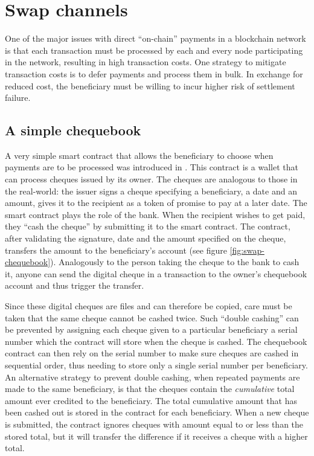 
\section{Swap channels}

One of the major issues with direct ``on-chain'' payments in a blockchain network is that each transaction must be processed by each and every node participating in the network, resulting in high transaction costs.
One strategy to mitigate transaction costs is to defer payments and process them in bulk. In exchange for reduced cost, the beneficiary must be willing to incur higher risk of settlement failure.

\subsection{A simple chequebook}\label{subsec:simple-chequebook}

A very simple smart contract that allows the beneficiary to choose when payments are to be processed was introduced in \cite{ethersphere2016sw3}.
This  contract is a wallet that can process cheques issued by its owner. The cheques are analogous to those in the real-world: the issuer signs a cheque specifying a beneficiary, a date and an amount, gives it to the recipient as a token of promise to pay at a later date. The smart contract plays the role of the bank. When the recipient wishes to get paid, they ``cash the cheque'' by submitting it to the smart contract. The contract, after validating the signature, date and the amount specified on the cheque, transfers the amount to the beneficiary's account (see figure \ref{fig:swap-chequebook}). Analogously to the person taking the cheque to the bank to cash it, anyone can send the digital cheque in a transaction to the owner's chequebook account and thus trigger the transfer. 



Since these digital cheques are files and can therefore be copied, care must be taken that the same cheque cannot be cashed twice. Such ``double cashing'' can be prevented by assigning each cheque given to a particular beneficiary a serial number which the contract will store when the cheque is cashed. The chequebook contract can then rely on the serial number to make sure cheques are cashed in sequential order, thus needing to store only a single serial number per beneficiary.
An alternative strategy to prevent double cashing, when repeated payments are made to the same beneficiary, is that the cheques contain the \emph{cumulative} total amount ever credited to the beneficiary. The total cumulative amount that has been cashed out is stored in the contract for each beneficiary. When a new cheque is submitted, the contract ignores cheques with amount equal to or less than the stored total, but it will transfer the difference if it receives a cheque with a higher total.

